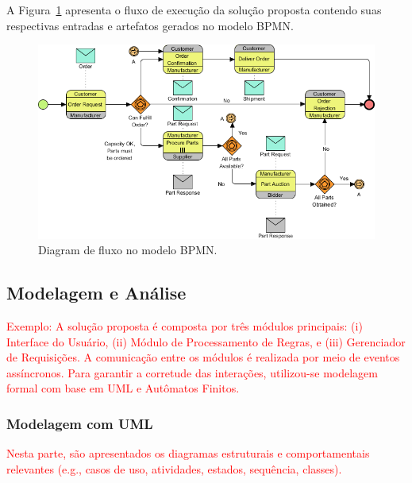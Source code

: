 A Figura~\ref{fig_digflow} apresenta o fluxo de execução da solução proposta contendo suas respectivas entradas e artefatos gerados no modelo BPMN.

\begin{figure}[h!]	
	\begin{center}
	    \includegraphics[scale=0.7]{imagens/34-final-business-process-diagram.png}
	\end{center}
    \caption{\label{fig_digflow}Diagram de fluxo no modelo BPMN.}
\end{figure}


\subsection{Modelagem e Análise}
\label{sec:modelagem-analise}


\textcolor{red}{Exemplo: A solução proposta é composta por três módulos principais: (i) Interface do Usuário, (ii) Módulo de Processamento de Regras, e (iii) Gerenciador de Requisições. A comunicação entre os módulos é realizada por meio de eventos assíncronos. Para garantir a corretude das interações, utilizou-se modelagem formal com base em UML e Autômatos Finitos.}


\subsubsection{Modelagem com UML}

\textcolor{red}{Nesta parte, são apresentados os diagramas estruturais e comportamentais relevantes (e.g., casos de uso, atividades, estados, sequência, classes).}

